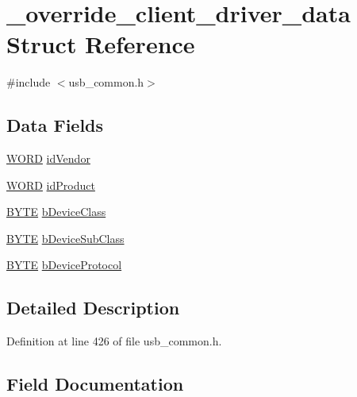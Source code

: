 \hypertarget{struct__override__client__driver__data}{}\section{\+\_\+override\+\_\+client\+\_\+driver\+\_\+data Struct Reference}
\label{struct__override__client__driver__data}


{\ttfamily \#include $<$usb\+\_\+common.\+h$>$}

\subsection*{Data Fields}
\begin{DoxyCompactItemize}
\item 
\hyperlink{_generic_type_defs_8h_a2b0e863dadf920709ec53d9088ee7c91}{W\+O\+R\+D} \hyperlink{struct__override__client__driver__data_aa6705f738420468e35fa0bcc980ef1d8}{id\+Vendor}
\item 
\hyperlink{_generic_type_defs_8h_a2b0e863dadf920709ec53d9088ee7c91}{W\+O\+R\+D} \hyperlink{struct__override__client__driver__data_ac5fdd724b5bba710af6f437f19467636}{id\+Product}
\item 
\hyperlink{_generic_type_defs_8h_a4ae1dab0fb4b072a66584546209e7d58}{B\+Y\+T\+E} \hyperlink{struct__override__client__driver__data_ab1f7e35fe9a285db2864e8244884c4d9}{b\+Device\+Class}
\item 
\hyperlink{_generic_type_defs_8h_a4ae1dab0fb4b072a66584546209e7d58}{B\+Y\+T\+E} \hyperlink{struct__override__client__driver__data_a1bfedb2dbf987caf616f77707f4e7996}{b\+Device\+Sub\+Class}
\item 
\hyperlink{_generic_type_defs_8h_a4ae1dab0fb4b072a66584546209e7d58}{B\+Y\+T\+E} \hyperlink{struct__override__client__driver__data_ad38c30dbe1ba3c63a2a24c3e2f988157}{b\+Device\+Protocol}
\end{DoxyCompactItemize}


\subsection{Detailed Description}


Definition at line 426 of file usb\+\_\+common.\+h.



\subsection{Field Documentation}
\hypertarget{struct__override__client__driver__data_ab1f7e35fe9a285db2864e8244884c4d9}{}

